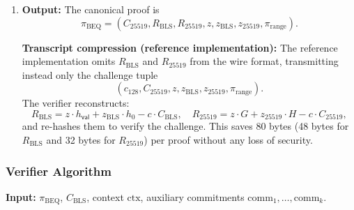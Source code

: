 \documentclass[11pt]{article}
\theoremstyle{definitionstyle}
\theoremstyle{plain}
\begin{document}
\begin{enumerate}[leftmargin=*]
\item \textbf{Output:}
  The canonical proof is
  \[
  \pi_{\text{BEQ}} = (C_{25519}, R_{\text{BLS}}, R_{25519}, z, z_{\text{BLS}}, z_{25519}, \pi_{\text{range}}).
  \]

  \textbf{Transcript compression (reference implementation):}
  The reference implementation omits $R_{\text{BLS}}$ and $R_{25519}$ from the wire format, transmitting instead only the challenge tuple
  \[
  (c_{128}, C_{25519}, z, z_{\text{BLS}}, z_{25519}, \pi_{\text{range}}).
  \]
  The verifier reconstructs:
  \[
  R_{\text{BLS}} = z \cdot h_{\mathsf{val}} + z_{\text{BLS}} \cdot h_0 - c \cdot C_{\text{BLS}}, \quad
  R_{25519} = z \cdot G + z_{25519} \cdot H - c \cdot C_{25519},
  \]
  and re-hashes them to verify the challenge. This saves 80 bytes (48 bytes for $R_{\text{BLS}}$ and 32 bytes for $R_{25519}$) per proof without any loss of security.
\end{enumerate}

\subsubsection{Verifier Algorithm}

\textbf{Input:} $\pi_{\text{BEQ}}$, $C_{\text{BLS}}$, context $\text{ctx}$, auxiliary commitments $\text{comm}_1,\dots,\text{comm}_k$.
\end{document}

